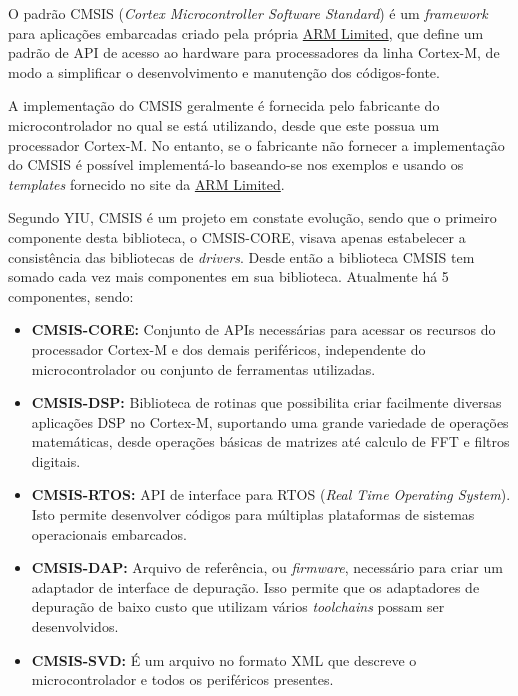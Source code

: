 O padrão CMSIS (\emph{Cortex Microcontroller Software Standard}) é um \emph{framework} para aplicações embarcadas criado pela própria \href{http://infocenter.arm.com/help/index.jsp}{ARM Limited}, que define um padrão de API de acesso ao hardware para processadores da linha Cortex-M, de modo a simplificar o desenvolvimento e manutenção dos códigos-fonte.

A implementação do CMSIS geralmente é fornecida pelo fabricante do microcontrolador no qual se está utilizando, desde que este possua um processador Cortex-M. No entanto, se o fabricante não fornecer a implementação do CMSIS é possível implementá-lo baseando-se nos exemplos e usando os \emph{templates} fornecido no site da \href{http://www.arm.com/products/processors/cortex-m/cortex-microcontroller-software-interface-standard.php}{ARM Limited}.

Segundo YIU\cite{ARMGUIDE}, CMSIS é um projeto em constate evolução, sendo que o primeiro componente desta biblioteca, o  CMSIS-CORE, visava apenas estabelecer a consistência das bibliotecas de \emph{drivers}. Desde então a biblioteca CMSIS tem somado cada vez mais componentes em sua biblioteca. Atualmente há 5 componentes, sendo: 

\begin{itemize}
	\item \textbf{CMSIS-CORE:} Conjunto de APIs necessárias para acessar os recursos do processador Cortex-M e dos demais periféricos, independente do microcontrolador ou conjunto de ferramentas utilizadas.
	
	\item \textbf{CMSIS-DSP:} Biblioteca de rotinas que possibilita criar facilmente diversas aplicações DSP no Cortex-M, suportando uma grande variedade de operações matemáticas, desde operações básicas de matrizes até calculo de FFT e filtros digitais. 
	
	\item \textbf{CMSIS-RTOS:} API de interface para RTOS (\emph{Real Time Operating System}). Isto permite desenvolver códigos para múltiplas plataformas de sistemas operacionais embarcados.
	
	\item \textbf{CMSIS-DAP:} Arquivo de referência, ou \emph{firmware}, necessário para criar um adaptador de interface de depuração. Isso permite que os adaptadores de depuração de baixo custo que utilizam vários \emph{toolchains} possam ser desenvolvidos.
	
	\item \textbf{CMSIS-SVD:} É um arquivo no formato XML que descreve o microcontrolador e todos os periféricos presentes.
\end{itemize}

